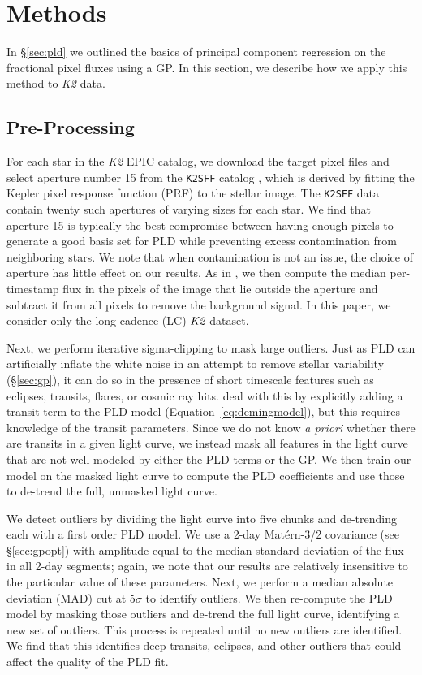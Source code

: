 \documentclass[]{emulateapj}
\begin{document}
\section{Methods}
\label{sec:methods}
In \S\ref{sec:pld} we outlined the basics of principal component regression
on the fractional pixel fluxes using a GP. In this section, we describe how we apply
this method to \emph{K2} data.

\subsection{Pre-Processing}
\label{sec:pre}
For each star in the \emph{K2} EPIC catalog, we download the target pixel files and
select aperture number 15 from the \texttt{K2SFF} catalog \citep{VJ14, VAN14}, which is derived
by fitting the Kepler pixel response function (PRF) to the stellar image. The \texttt{K2SFF}
data contain twenty such apertures of varying sizes for each star. We find that aperture 15
is typically the best compromise between having enough pixels to generate a good basis
set for PLD while preventing excess contamination from neighboring stars. We note that
when contamination is not an issue, the choice of aperture has little effect on our results.
As in \cite{VJ14}, we then compute the median per-timestamp flux in the pixels of the image 
that lie outside the aperture and subtract it from all pixels
to remove the background signal. In this paper, we consider only the long cadence (LC)
$\emph{K2}$ dataset.

Next, we perform iterative sigma-clipping to mask large outliers. Just
as PLD can artificially inflate the white noise in an attempt to remove stellar
variability (\S\ref{sec:gp}), it can do so in the presence of short timescale features
such as eclipses, transits, flares, or cosmic ray hits. \cite{DEM15} deal with this
by explicitly adding a transit term to the PLD model (Equation~\ref{eq:demingmodel}),
but this requires knowledge of the transit parameters. Since we do not
know \emph{a priori} whether there are transits in a given light curve, we instead 
mask all features in the light curve that are not well modeled by either the PLD
terms or the GP. We then train our model on the masked light curve to compute the
PLD coefficients and use those to de-trend the full, unmasked light curve.

We detect outliers by dividing the light curve into five chunks and de-trending each
with a first order PLD model. We use a 2-day Mat\'ern-3/2
covariance (see \S\ref{sec:gpopt}) with amplitude equal to the median standard deviation
of the flux in all 2-day segments; again, we note that our results are relatively
insensitive to the particular value of these parameters. Next, we perform a
median absolute deviation (MAD) cut at 5$\sigma$ to identify outliers.
We then re-compute the PLD model by masking those outliers and de-trend the full
light curve, identifying a new set of outliers. This process is repeated until no new outliers
are identified. We find that this identifies deep transits, eclipses, and
other outliers that could affect the quality of the PLD fit.
\end{document}
